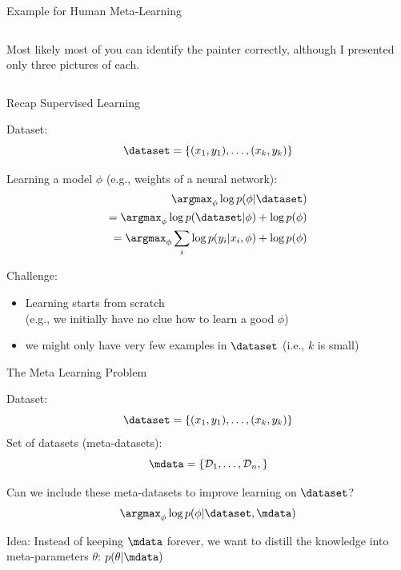 \begin{frame}[c]{Example for Human Meta-Learning}
\begin{columns}
	\pause
	Most likely most of you can identify the painter correctly, 
	although I presented only three pictures of each.
\end{columns}

\end{frame}
\begin{frame}[c]{Recap Supervised Learning}

Dataset:
\begin{equation}
\dataset = \{(x_1, y_1), \ldots, (x_k, y_k) \}
\end{equation}

\bigskip
\pause

Learning a model $\phi$ (e.g., weights of a neural network):
\begin{eqnarray}
\argmax_{\phi} \log p(\phi|\dataset)\\
= \argmax_{\phi} \log p(\dataset | \phi) + \log p(\phi) \\
= \argmax_{\phi} \sum_i \log p(y_i | x_i, \phi) + \log p(\phi)
\end{eqnarray}

Challenge:
\begin{itemize}
	\item Learning starts from scratch\\
	(e.g., we initially have no clue how to learn a good $\phi$)
	\item we might only have very few examples in $\dataset$ 
	(i.e., $k$ is small)
\end{itemize}

\end{frame}
\begin{frame}[c]{The Meta Learning Problem}

Dataset:
\begin{equation}
\dataset = \{(x_1, y_1), \ldots, (x_k, y_k) \}
\end{equation}
Set of datasets (meta-datasets):
\begin{equation}
\mdata = \{\mathcal{D}_1, \ldots, \mathcal{D}_n, \}
\end{equation}

\pause
Can we include these meta-datasets to improve learning on $\dataset$?
\begin{equation}
\argmax_{\phi} \log p(\phi|\dataset, \mdata)
\end{equation}

\pause
\medskip

\alert{Idea:} Instead of keeping $\mdata$ forever, we want to distill the knowledge into \alert{meta-parameters $\theta$}: $p(\theta|\mdata)$
 

\end{frame}
